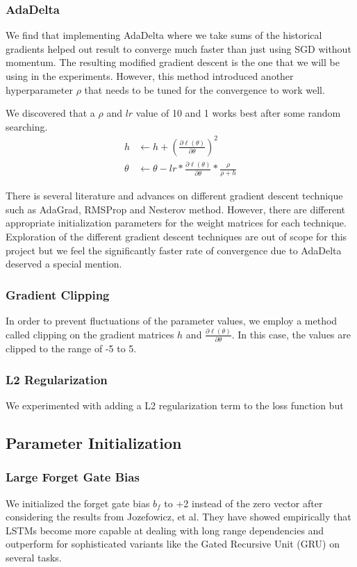 \documentclass[fyp]{socreport}
\begin{document}
\subsubsection{AdaDelta} We find that implementing AdaDelta where we take sums
of the historical gradients helped out result to converge much faster than just
using SGD without momentum. The resulting modified gradient descent is the one
that we will be using in the experiments. However, this method introduced another
hyperparameter $\rho$ that needs to be tuned for the convergence to work well.

We discovered that a $\rho$ and $lr$ value of 10 and 1 works best after some
random searching.
\begin{align*}
  h &\leftarrow h + \left( \frac{\partial \ell(\theta)}{\partial \theta} \right)^2 \\
  \theta &\leftarrow \theta - lr * \frac{\partial \ell(\theta)}{\partial \theta}
  * \frac{\rho}{\rho + h}
\end{align*}

There is several literature and advances on different gradient descent
technique such as AdaGrad, RMSProp and Nesterov method.  However, there are
different appropriate initialization parameters for the weight matrices for
each technique.  Exploration of the different gradient descent techniques
are out of scope for this project but we feel the significantly faster rate of
convergence due to AdaDelta deserved a special mention.

\subsubsection{Gradient Clipping} In order to prevent fluctuations of the parameter
values, we employ a method called clipping on the gradient matrices $h$ and
$\frac{\partial \ell(\theta)}{\partial \theta}$. In this case, the values are
clipped to the range of -5 to 5.

\subsubsection{L2 Regularization} We experimented with adding a L2
regularization term to the loss function but


\subsection{Parameter Initialization}

\subsubsection{Large Forget Gate Bias} We initialized the forget gate bias
$b_f$ to +2 instead of the zero vector after considering the results from
Jozefowicz, et al\cite{ICML2015JozefowiczZS}. They have showed empirically that
LSTMs become more capable at dealing with long range dependencies and outperform
for sophisticated variants like the Gated Recursive Unit (GRU) on several
tasks.
\end{document}
